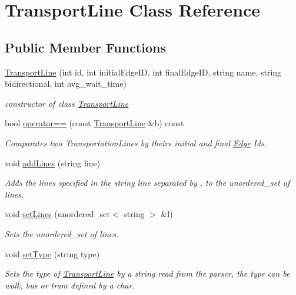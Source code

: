 \hypertarget{class_transport_line}{}\section{Transport\+Line Class Reference}
\label{class_transport_line}
\subsection*{Public Member Functions}
\begin{DoxyCompactItemize}
\item 
\hyperlink{class_transport_line_a7ac6033c3c626a79c9cabc6957ad984d}{Transport\+Line} (int id, int initial\+Edge\+ID, int final\+Edge\+ID, string name, string bidirectional, int avg\+\_\+wait\+\_\+time)
\begin{DoxyCompactList}\small\item\em constructor of class \hyperlink{class_transport_line}{Transport\+Line} \end{DoxyCompactList}\item 
bool \hyperlink{class_transport_line_a28ceb0e37f2773d4f9f95d6539170147}{operator==} (const \hyperlink{class_transport_line}{Transport\+Line} \&b) const
\begin{DoxyCompactList}\small\item\em Comparates two Transportation\+Lines by theirs initial and final \hyperlink{class_edge}{Edge} Id\textquotesingle{}s. \end{DoxyCompactList}\item 
void \hyperlink{class_transport_line_aca504818880b0738c8533dda5482d25a}{add\+Lines} (string line)
\begin{DoxyCompactList}\small\item\em Adds the lines specified in the string line separated by \textquotesingle{},\textquotesingle{} to the unordered\+\_\+set of lines. \end{DoxyCompactList}\item 
void \hyperlink{class_transport_line_a601961d84ba1b20a1afe84077dc3d9ec}{set\+Lines} (unordered\+\_\+set$<$ string $>$ \&l)
\begin{DoxyCompactList}\small\item\em Sets the unordered\+\_\+set of lines. \end{DoxyCompactList}\item 
void \hyperlink{class_transport_line_a134eac7334a92d4efe98092277895580}{set\+Type} (string type)
\begin{DoxyCompactList}\small\item\em Sets the type of \hyperlink{class_transport_line}{Transport\+Line} by a string read from the parser, the type can be walk, bus or tram defined by a char. \end{DoxyCompactList}\item 

\end{DoxyCompactItemize}
